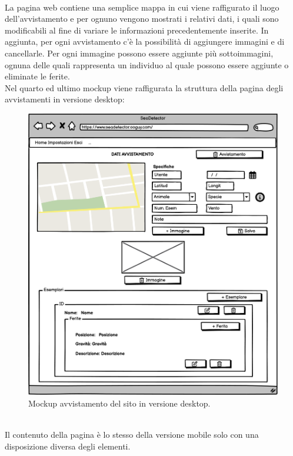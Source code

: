 \documentclass[a4paper,final,12pt]{report}
\begin{document}
\\La pagina web contiene una semplice mappa in cui viene raffigurato il luogo dell'avvistamento e per ognuno vengono mostrati i relativi dati, i quali sono modificabili al fine di variare le informazioni precedentemente inserite. In aggiunta, per ogni avvistamento c'è la possibilità di aggiungere immagini e di cancellarle. Per ogni immagine possono essere aggiunte più sottoimmagini, ognuna delle quali rappresenta un individuo al quale possono essere aggiunte o eliminate le ferite.\\
Nel quarto ed ultimo mockup viene raffigurata la struttura della pagina degli avvistamenti in versione desktop:
\begin{figure}[hbtp]
\centering
\includegraphics[scale=0.47]{img_concettuale/avvistamentoDesk.png}
\caption{Mockup avvistamento del sito in versione desktop.}
\end{figure}
\\Il contenuto della pagina è lo stesso della versione mobile solo con una disposizione diversa degli elementi.
\end{document}
